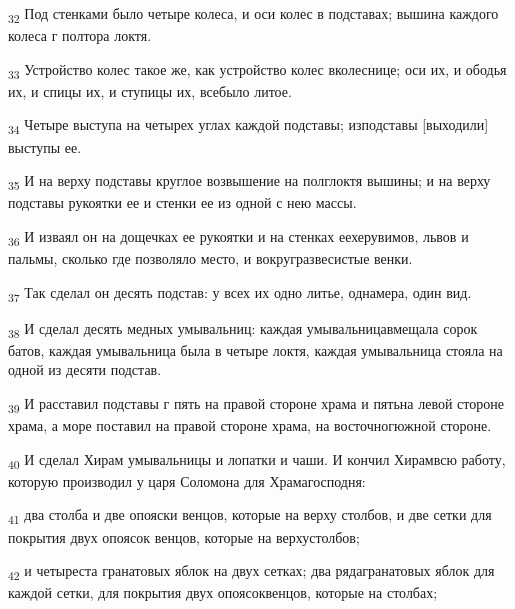 \begin{tcolorbox}
\textsubscript{32} Под стенками было четыре колеса, и оси колес в подставах; вышина каждого колеса г полтора локтя.
\end{tcolorbox}
\begin{tcolorbox}
\textsubscript{33} Устройство колес такое же, как устройство колес вколеснице; оси их, и ободья их, и спицы их, и ступицы их, всебыло литое.
\end{tcolorbox}
\begin{tcolorbox}
\textsubscript{34} Четыре выступа на четырех углах каждой подставы; изподставы [выходили] выступы ее.
\end{tcolorbox}
\begin{tcolorbox}
\textsubscript{35} И на верху подставы круглое возвышение на полглоктя вышины; и на верху подставы рукоятки ее и стенки ее из одной с нею массы.
\end{tcolorbox}
\begin{tcolorbox}
\textsubscript{36} И изваял он на дощечках ее рукоятки и на стенках еехерувимов, львов и пальмы, сколько где позволяло место, и вокругразвесистые венки.
\end{tcolorbox}
\begin{tcolorbox}
\textsubscript{37} Так сделал он десять подстав: у всех их одно литье, однамера, один вид.
\end{tcolorbox}
\begin{tcolorbox}
\textsubscript{38} И сделал десять медных умывальниц: каждая умывальницавмещала сорок батов, каждая умывальница была в четыре локтя, каждая умывальница стояла на одной из десяти подстав.
\end{tcolorbox}
\begin{tcolorbox}
\textsubscript{39} И расставил подставы г пять на правой стороне храма и пятьна левой стороне храма, а море поставил на правой стороне храма, на восточногюжной стороне.
\end{tcolorbox}
\begin{tcolorbox}
\textsubscript{40} И сделал Хирам умывальницы и лопатки и чаши. И кончил Хирамвсю работу, которую производил у царя Соломона для Храмагосподня:
\end{tcolorbox}
\begin{tcolorbox}
\textsubscript{41} два столба и две опояски венцов, которые на верху столбов, и две сетки для покрытия двух опоясок венцов, которые на верхустолбов;
\end{tcolorbox}
\begin{tcolorbox}
\textsubscript{42} и четыреста гранатовых яблок на двух сетках; два рядагранатовых яблок для каждой сетки, для покрытия двух опоясоквенцов, которые на столбах;
\end{tcolorbox}
